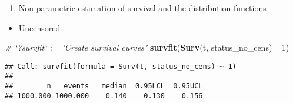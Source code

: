 \documentclass[]{book}
\newenvironment{Shaded}{\begin{snugshade}}{\end{snugshade}}
\newcommand{\KeywordTok}[1]{\textcolor[rgb]{0.13,0.29,0.53}{\textbf{{#1}}}}
\newcommand{\DecValTok}[1]{\textcolor[rgb]{0.00,0.00,0.81}{{#1}}}
\newcommand{\StringTok}[1]{\textcolor[rgb]{0.31,0.60,0.02}{{#1}}}
\newcommand{\CommentTok}[1]{\textcolor[rgb]{0.56,0.35,0.01}{\textit{{#1}}}}
\newcommand{\NormalTok}[1]{{#1}}
\providecommand{\tightlist}{%
  \setlength{\itemsep}{0pt}\setlength{\parskip}{0pt}}
\theoremstyle{definition}
\theoremstyle{definition}
\theoremstyle{definition}
\theoremstyle{remark}
\begin{document}
\begin{enumerate}
\def\labelenumi{\arabic{enumi}.}
\setcounter{enumi}{3}
\tightlist
\item
  Non parametric estimation of survival and the distribution functions
\end{enumerate}

\begin{itemize}
\tightlist
\item
  Uncensored
\end{itemize}

\begin{Shaded}
\begin{Highlighting}[]
\CommentTok{# `?survfit` := "Create survival curves"}
\KeywordTok{survfit}\NormalTok{(}\KeywordTok{Surv}\NormalTok{(t, status_no_cens) ~}\StringTok{ }\DecValTok{1}\NormalTok{)}
\end{Highlighting}
\end{Shaded}

\begin{verbatim}
## Call: survfit(formula = Surv(t, status_no_cens) ~ 1)
## 
##        n   events   median  0.95LCL  0.95UCL 
## 1000.000 1000.000    0.140    0.130    0.156
\end{verbatim}
\end{document}
